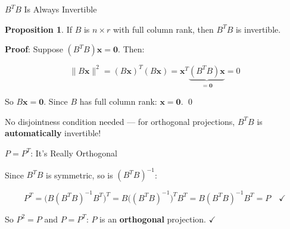 \documentclass[10pt]{beamer}
\theoremstyle{definition}
\newtheorem{prop}{Proposition}[section]
\newcommand{\x}[1]{\alert{\textbf{#1}}}
\begin{document}
\begin{frame}{$B^TB$ Is Always Invertible}

\begin{prop}
If $B$ is $n \times r$ with full column rank, then $B^TB$ is invertible.
\end{prop}

\vspace{0.3em}

\textbf{Proof}: Suppose $(B^TB)\mathbf{x} = \mathbf{0}$. Then:

$$\|B\mathbf{x}\|^2 = (B\mathbf{x})^T(B\mathbf{x}) = \mathbf{x}^T\underbrace{(B^TB)\mathbf{x}}_{= \mathbf{0}} = 0$$

So $B\mathbf{x} = \mathbf{0}$. Since $B$ has full column rank: $\mathbf{x} = \mathbf{0}$. \qed

\vspace{0.5em}

No disjointness condition needed --- for orthogonal projections, $B^TB$ is \x{automatically} invertible!

\end{frame}


\begin{frame}{$P = P^T$: It's Really Orthogonal}

Since $B^TB$ is symmetric, so is $(B^TB)^{-1}$:

$$P^T = \big(B(B^TB)^{-1}B^T\big)^T = B\big((B^TB)^{-1}\big)^TB^T = B(B^TB)^{-1}B^T = P \quad \checkmark$$

\vspace{0.5em}

So $P^2 = P$ and $P = P^T$: $P$ is an \x{orthogonal} projection. $\checkmark$

\end{frame}
\end{document}
